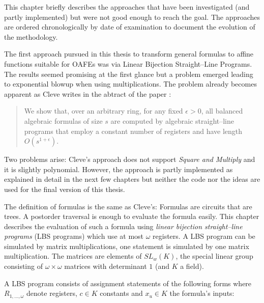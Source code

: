 \label{sec:discontinued}

This chapter briefly describes the approaches that have been investigated (and
partly implemented) but were not good enough to reach the goal. The approaches
are ordered chronologically by date of examination to document the evolution of
the methodology.


%
%
\label{sec:using-lbs}

The first approach pursued in this thesis to transform general formulas to
affine functions suitable for OAFEs was via Linear Bijection Straight--Line
Programs.  The results seemed promising at the first glance but a problem
emerged leading to exponential blowup when using multiplications. The problem
already becomes apparent as Cleve writes in the abtract of the paper
\cite{cleve91}:

\begin{quote}
  We show that, over an arbitrary ring, for any fixed $\epsilon > 0$, all
  balanced algebraic formulas of size $s$ are computed by algebraic
  straight--line programs that employ a constant number of registers and have
  length $O(s^{1 + \epsilon})$.\cite{cleve91}
\end{quote}

\noindent{}Two problems arise: Cleve's approach does not support \emph{Square
and Multiply}\cite{knuth81} and it is slightly polynomial. However, the approach
is partly implemented as explained in detail in the next few chapters but
neither the code nor the ideas are used for the final version of this thesis.

\label{sec:FormulasToMatrixMuls}

The definition of formulas is the same as Cleve's\cite{cleve91}: Formulas are
circuits that are trees. A postorder traversal is enough to evaluate the formula
easily. This chapter describes the evaluation of such a formula using
\emph{linear bijection straight--line programs} (LBS programs)\cite{cleve91}
which use at most $\omega$ registers. A LBS program can be simulated by matrix
multiplications, one statement is simulated by one matrix multiplication. The
matrices are elements of $SL_w(K)$, the special linear group consisting of
$\omega \times \omega$ matrices with determinant $1$ (and $K$ a field).

A LBS program consists of assignment statements of the following
forms where $R_{1,...,\omega}$ denote registers, $c \in K$ constants and $x_u
\in K$ the formula's inputs:

